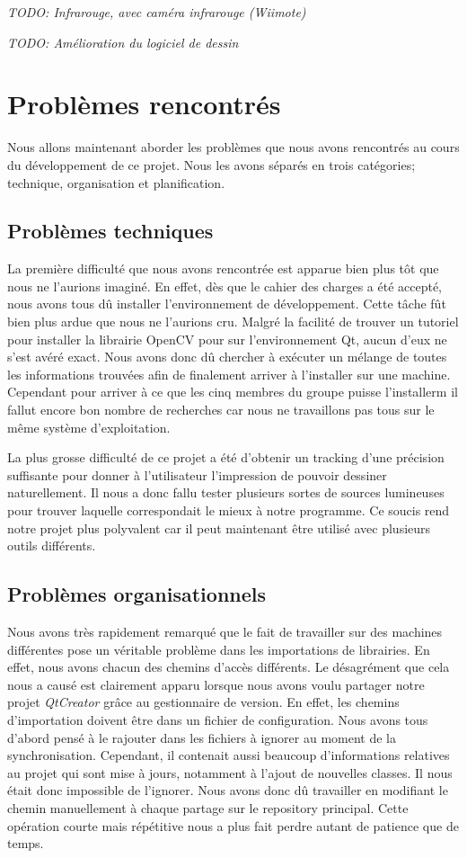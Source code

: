 \documentclass[11pt,a4paper,oldfontcommands]{memoir}
\begin{document}
\textit{TODO: Infrarouge, avec caméra infrarouge (Wiimote)}

\textit{TODO: Amélioration du logiciel de dessin}

\section{Problèmes rencontrés}

Nous allons maintenant aborder les problèmes que nous avons rencontrés au cours du développement de ce projet. Nous les avons séparés en trois catégories;  technique, organisation et planification.

\subsection{Problèmes techniques}

La première difficulté que nous avons rencontrée est apparue bien plus tôt que nous ne l'aurions imaginé. En effet, dès que le cahier des charges a été accepté, nous avons tous dû installer l'environnement de développement. Cette tâche fût bien plus ardue que nous ne l'aurions cru. Malgré la facilité de trouver un tutoriel pour installer la librairie OpenCV pour sur l'environnement Qt, aucun d'eux ne s'est avéré exact. Nous avons donc dû chercher à exécuter un mélange de toutes les informations trouvées afin de finalement arriver à l'installer sur une machine. Cependant pour arriver à ce que les cinq membres du groupe puisse l'installerm il fallut encore bon nombre de recherches car nous ne travaillons pas tous sur le même système d'exploitation.

La plus grosse difficulté de ce projet a été d'obtenir un tracking d'une précision suffisante pour donner à l'utilisateur l'impression de pouvoir dessiner naturellement. Il nous a donc fallu tester plusieurs sortes de sources lumineuses pour trouver laquelle correspondait le mieux à notre programme. Ce soucis rend notre projet plus polyvalent car il peut maintenant être utilisé avec plusieurs outils différents.

\subsection{Problèmes organisationnels}

Nous avons très rapidement remarqué que le fait de travailler sur des machines différentes pose un véritable problème dans les importations de librairies. En effet, nous avons chacun des chemins d'accès différents. Le désagrément que cela nous a causé est clairement apparu lorsque nous avons voulu partager notre projet \textit{QtCreator} grâce au gestionnaire de version. En effet, les chemins d'importation doivent être dans un fichier de configuration. Nous avons tous d'abord pensé à le rajouter dans les fichiers à ignorer au moment de la synchronisation. Cependant, il contenait aussi beaucoup d'informations relatives au projet qui sont mise à jours, notamment à l'ajout de nouvelles classes. Il nous était donc impossible de l'ignorer. Nous avons donc dû travailler en modifiant le chemin manuellement à chaque partage sur le repository principal. Cette opération courte mais répétitive nous a plus fait perdre autant de patience que de temps.
\end{document}
